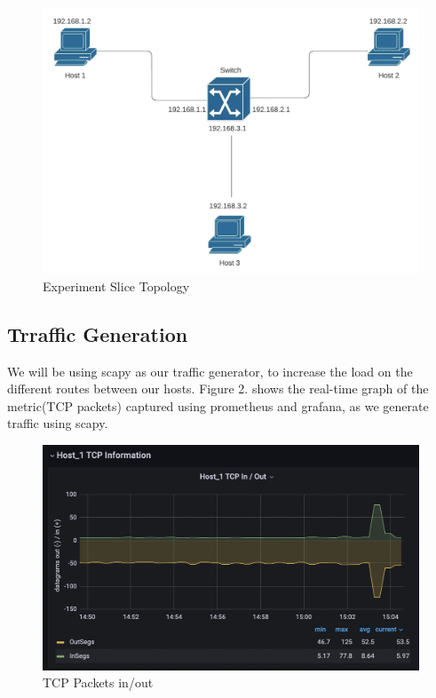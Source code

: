 \documentclass[conference]{IEEEtran}
\begin{document}
    \begin{figure}[h!]
        \includegraphics[scale=0.2]{Initial Switch topology.png}
        \centering
        \caption{Experiment Slice Topology}
    \end{figure}

    \subsection{Trraffic Generation}
    We will be using scapy as our traffic generator, to increase the load on the different routes between our hosts. Figure 2. shows the real-time graph of the metric(TCP packets) captured using prometheus and grafana, as we generate traffic using scapy.

    \begin{figure}[h!]
        \includegraphics[scale=0.3]{Graph1.png}
        \centering
        \caption{TCP Packets in/out}
    \end{figure}
\end{document}
